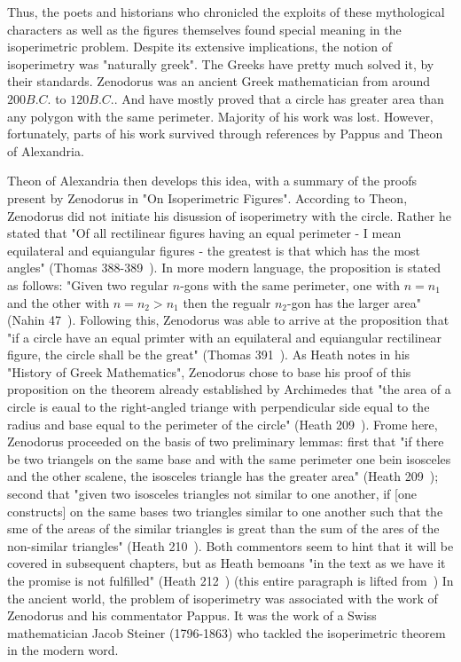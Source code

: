 \documentclass[a4paper]{book}
\begin{document}
\leavevmode
\newline
\newline
Thus, the poets and historians who chronicled the exploits of these mythological characters as well as the figures themselves found special meaning in the isoperimetric problem. Despite its extensive implications, the notion of isoperimetry was "naturally greek". The Greeks have pretty much solved it, by their standards. Zenodorus was an ancient Greek mathematician from around $200B.C.$ to $120B.C.$. And have mostly proved that a circle has greater area than any polygon with the same perimeter. Majority of his work was lost. However, fortunately, parts of his work survived through references by Pappus and Theon of Alexandria.

Theon of Alexandria then develops this idea, with a summary of the proofs present by Zenodorus in "On Isoperimetric Figures". According to Theon, Zenodorus did not initiate his disussion of isoperimetry with the circle. Rather he stated that "Of all rectilinear figures having an equal perimeter - I mean equilateral and equiangular figures - the greatest is that which has the most angles" (Thomas 388-389~\cite{ivor1941selections}). In more modern language, the proposition is stated as follows: "Given two regular $n$-gons with the same perimeter, one with $n=n_1$ and the other with $n=n_2>n_1$ then the regualr $n_2$-gon has the larger area" (Nahin 47~\cite{nahin2021least}). Following this, Zenodorus was able to arrive at the proposition that "if a circle have an equal primter with an equilateral and equiangular rectilinear figure, the circle shall be the great" (Thomas 391~\cite{ivor1941selections}). As Heath notes in his "History of Greek Mathematics", Zenodorus chose to base his proof of this proposition on the theorem already established by Archimedes that "the area of a circle is eaual to the right-angled triange with perpendicular side equal to the radius and base equal to the perimeter of the circle" (Heath 209~\cite{heath2013history}). Frome here, Zenodorus proceeded on the basis of two preliminary lemmas: first that "if there be two triangels on the same base and with the same perimeter one bein isosceles and the other scalene, the isosceles triangle has the greater area" (Heath 209~\cite{heath2013history}); second that "given two isosceles triangles not similar to one another, if [one constructs] on the same bases two triangles similar to one another such that the sme of the areas of the similar triangles is great than the sum of the ares of the non-similar triangles" (Heath 210~\cite{heath2013history}). Both commentors seem to hint that it will be covered in subsequent chapters, but as Heath bemoans "in the text as we have it the promise is not fulfilled" (Heath 212~\cite{heath2013history}) (this entire paragraph is lifted from~\cite{wiegert2010sagacity})
\newline
\newline
In the ancient world, the problem of isoperimetry was associated with the work of Zenodorus and his commentator Pappus. It was the work of a  Swiss mathematician Jacob Steiner (1796-1863) who tackled the isoperimetric theorem in the modern word.
\end{document}
